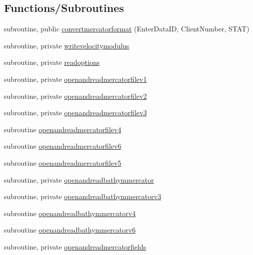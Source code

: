 \subsection*{Functions/\+Subroutines}
\begin{DoxyCompactItemize}
\item 
subroutine, public \mbox{\hyperlink{namespacemodulemercatorformat_ab5fa5a32b4c60eb82b51453effd56cbf}{convertmercatorformat}} (Enter\+Data\+ID, Client\+Number, S\+T\+AT)
\item 
subroutine, private \mbox{\hyperlink{namespacemodulemercatorformat_a5f3b3ad2a9dc5c613cf6911d366fdc46}{writevelocitymodulus}}
\item 
subroutine, private \mbox{\hyperlink{namespacemodulemercatorformat_a610d0a01acb7506904c2ea4c84bc688e}{readoptions}}
\item 
subroutine, private \mbox{\hyperlink{namespacemodulemercatorformat_a2cf596b9eace6fa889296e8e6079f834}{openandreadmercatorfilev1}}
\item 
subroutine, private \mbox{\hyperlink{namespacemodulemercatorformat_ac844e04662b11a4b75858e60dcdd690a}{openandreadmercatorfilev2}}
\item 
subroutine, private \mbox{\hyperlink{namespacemodulemercatorformat_ad3d103ba2c19d6a10af53c4f7caf2a16}{openandreadmercatorfilev3}}
\item 
subroutine \mbox{\hyperlink{namespacemodulemercatorformat_a784b726c2a75725a56db4e874c93724a}{openandreadmercatorfilev4}}
\item 
subroutine \mbox{\hyperlink{namespacemodulemercatorformat_ab8e00c6758579bd5d8a955326cb3d6d1}{openandreadmercatorfilev6}}
\item 
subroutine \mbox{\hyperlink{namespacemodulemercatorformat_a693845c08b34a8acfedbf088b2a06787}{openandreadmercatorfilev5}}
\item 
subroutine, private \mbox{\hyperlink{namespacemodulemercatorformat_a35d03eb5f2e2fadb8622f62f744f0b97}{openandreadbathymmercator}}
\item 
subroutine, private \mbox{\hyperlink{namespacemodulemercatorformat_a97c77676ac9667492c50594f60e6c907}{openandreadbathymmercatorv3}}
\item 
subroutine \mbox{\hyperlink{namespacemodulemercatorformat_a8fac17a041e16d3f9659e7665adf2656}{openandreadbathymmercatorv4}}
\item 
subroutine \mbox{\hyperlink{namespacemodulemercatorformat_a19c4e862a6301eb0e3e8c373ab8a15f9}{openandreadbathymmercatorv6}}
\item 
subroutine, private \mbox{\hyperlink{namespacemodulemercatorformat_a2c5e1b6294e73cf15d0617776b56408c}{openandreadmercatorfields}}

\end{DoxyCompactItemize}
